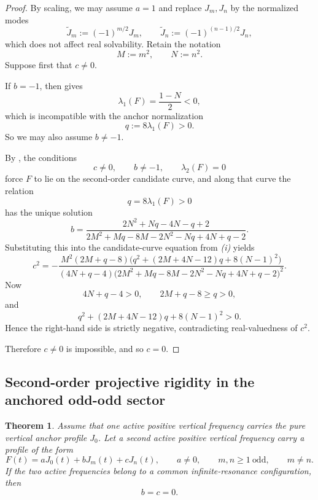 \documentclass[11pt,reqno]{amsart}
\newtheorem{theorem}{Theorem}[section]
\theoremstyle{definition}
\begin{document}
\begin{proof}
By scaling, we may assume $a=1$ and replace $J_m,J_n$ by the normalized modes
\[
\widetilde J_m:=(-1)^{m/2}J_m,
\qquad
\widetilde J_n:=(-1)^{(n-1)/2}J_n,
\]
which does not affect real solvability. Retain the notation
\[
M:=m^2,
\qquad
N:=n^2.
\]
Suppose first that $c\neq 0$.

If $b=-1$, then  gives
\[
\lambda_1(F)=\frac{1-N}{2}<0,
\]
which is incompatible with the anchor normalization
\[
q:=8\lambda_1(F)>0.
\]
So we may also assume $b\neq -1$.

By , the conditions
\[
c\neq 0,
\qquad
b\neq -1,
\qquad
\lambda_2(F)=0
\]
force $F$ to lie on the second-order candidate curve, and along that curve the relation
\[
q=8\lambda_1(F)>0
\]
has the unique solution
\[
b=
\frac{2N^2+Nq-4N-q+2}
{2M^2+Mq-8M-2N^2-Nq+4N+q-2}.
\]
Substituting this into the candidate-curve equation from
\emph{(i)} yields
\[
c^2
=
-\frac{M^2(2M+q-8)\bigl(q^2+(2M+4N-12)q+8(N-1)^2\bigr)}
{(4N+q-4)\bigl(2M^2+Mq-8M-2N^2-Nq+4N+q-2\bigr)^2}.
\]
Now
\[
4N+q-4>0,
\qquad
2M+q-8\ge q>0,
\]
and
\[
q^2+(2M+4N-12)q+8(N-1)^2>0.
\]
Hence the right-hand side is strictly negative, contradicting real-valuedness of $c^2$.

Therefore $c\neq 0$ is impossible, and so $c=0$.
\end{proof}

\subsection*{Second-order projective rigidity in the anchored odd-odd sector}

\begin{theorem}\label{thm:anchor-oddodd-second-order-rigidity}
Assume that one active positive vertical frequency carries the pure vertical anchor profile
$J_0$. Let a second active positive vertical frequency carry a profile of the form
\[
F(t)=aJ_0(t)+bJ_m(t)+cJ_n(t),
\qquad
a\neq 0,
\qquad
m,n\ge 1\ \text{odd},
\qquad
m\neq n.
\]
If the two active frequencies belong to a common infinite-resonance configuration, then
\[
b=c=0.
\]
\end{theorem}
\end{document}
